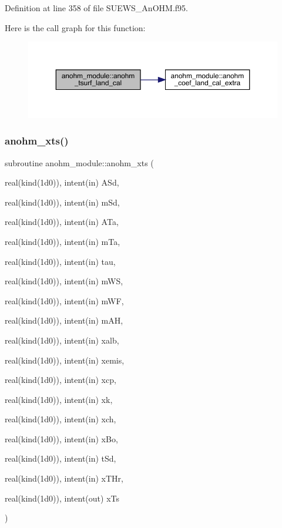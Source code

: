 Definition at line 358 of file S\+U\+E\+W\+S\+\_\+\+An\+O\+H\+M.\+f95.

Here is the call graph for this function\+:\nopagebreak
\begin{figure}[H]
\begin{center}
\leavevmode
\includegraphics[width=350pt]{namespaceanohm__module_a3f1a576bdde691f251c98f56d28b6c5e_cgraph}
\end{center}
\end{figure}
\mbox{\label{namespaceanohm__module_a54c27af87baa1736fd40590bed6c081e}} 
\subsubsection{\texorpdfstring{anohm\+\_\+xts()}{anohm\_xts()}}
{\footnotesize\ttfamily subroutine anohm\+\_\+module\+::anohm\+\_\+xts (\begin{DoxyParamCaption}\item[{real(kind(1d0)), intent(in)}]{A\+Sd,  }\item[{real(kind(1d0)), intent(in)}]{m\+Sd,  }\item[{real(kind(1d0)), intent(in)}]{A\+Ta,  }\item[{real(kind(1d0)), intent(in)}]{m\+Ta,  }\item[{real(kind(1d0)), intent(in)}]{tau,  }\item[{real(kind(1d0)), intent(in)}]{m\+WS,  }\item[{real(kind(1d0)), intent(in)}]{m\+WF,  }\item[{real(kind(1d0)), intent(in)}]{m\+AH,  }\item[{real(kind(1d0)), intent(in)}]{xalb,  }\item[{real(kind(1d0)), intent(in)}]{xemis,  }\item[{real(kind(1d0)), intent(in)}]{xcp,  }\item[{real(kind(1d0)), intent(in)}]{xk,  }\item[{real(kind(1d0)), intent(in)}]{xch,  }\item[{real(kind(1d0)), intent(in)}]{x\+Bo,  }\item[{real(kind(1d0)), intent(in)}]{t\+Sd,  }\item[{real(kind(1d0)), intent(in)}]{x\+T\+Hr,  }\item[{real(kind(1d0)), intent(out)}]{x\+Ts }\end{DoxyParamCaption})}



